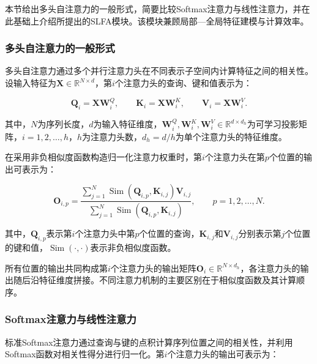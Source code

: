 本节给出多头自注意力的一般形式，简要比较Softmax注意力与线性注意力，并在此基础上介绍所提出的SLFA模块。该模块兼顾局部—全局特征建模与计算效率。



\subsubsection{多头自注意力的一般形式}

多头自注意力通过多个并行注意力头在不同表示子空间内计算特征之间的相关性\cite{ref34}。设输入特征为$\mathbf X\in\mathbb R^{N\times d}$，第$i$个注意力头的查询、键和值表示为：

\begin{equation}
\mathbf Q_i=\mathbf X\mathbf W_i^Q,\qquad
\mathbf K_i=\mathbf X\mathbf W_i^K,\qquad
\mathbf V_i=\mathbf X\mathbf W_i^V.
\label{eq:qkv_projection}
\end{equation}

其中，$N$为序列长度，$d$为输入特征维度，$\mathbf W_i^Q,\mathbf W_i^K,\mathbf W_i^V\in\mathbb R^{d\times d_h}$为可学习投影矩阵，$i=1,2,\ldots,h$，$h$为注意力头数，$d_h=d/h$为单个注意力头的特征维度。

在采用非负相似度函数构造归一化注意力权重时，第$i$个注意力头在第$p$个位置的输出可表示为：

\begin{equation}
\mathbf O_{i,p}
=
\frac{
\displaystyle\sum_{j=1}^{N}
\operatorname{Sim}\left(\mathbf Q_{i,p},\mathbf K_{i,j}\right)\mathbf V_{i,j}
}{
\displaystyle\sum_{j=1}^{N}
\operatorname{Sim}\left(\mathbf Q_{i,p},\mathbf K_{i,j}\right)
},
\qquad p=1,2,\ldots,N.
\label{eq:general_attention}
\end{equation}

其中，$\mathbf Q_{i,p}$表示第$i$个注意力头中第$p$个位置的查询，$\mathbf K_{i,j}$和$\mathbf V_{i,j}$分别表示第$j$个位置的键和值，$\operatorname{Sim}(\cdot,\cdot)$表示非负相似度函数\cite{ref40}。

所有位置的输出共同构成第$i$个注意力头的输出矩阵$\mathbf O_i\in\mathbb R^{N\times d_h}$，各注意力头的输出随后沿特征维度拼接。不同注意力机制的主要区别在于相似度函数及其计算顺序。

\subsubsection{Softmax注意力与线性注意力}

标准Softmax注意力通过查询与键的点积计算序列位置之间的相关性，并利用Softmax函数对相关性得分进行归一化\cite{ref34}。第$i$个注意力头的输出可表示为：

